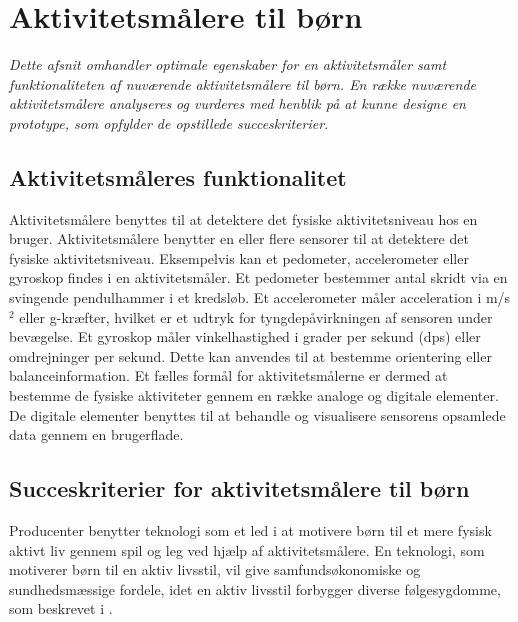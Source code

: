 \section{Aktivitetsmålere til børn} \label{tracker_intro}
\textit{Dette afsnit omhandler optimale egenskaber for en aktivitetsmåler samt funktionaliteten af nuværende aktivitetsmålere til børn. En række nuværende aktivitetsmålere analyseres og vurderes med henblik på at kunne designe en prototype, som opfylder de opstillede succeskriterier.}

\subsection{Aktivitetsmåleres funktionalitet}
Aktivitetsmålere benyttes til at detektere det fysiske aktivitetsniveau hos en bruger. Aktivitetsmålere benytter en eller flere sensorer til at detektere det fysiske aktivitetsniveau. Eksempelvis kan et pedometer, accelerometer eller gyroskop findes i en aktivitetsmåler. Et pedometer bestemmer antal skridt via en svingende pendulhammer i et kredsløb. Et accelerometer måler acceleration i m/s$^2$ eller g-kræfter, hvilket er et udtryk for tyngdepåvirkningen af sensoren under bevægelse. Et gyroskop måler vinkelhastighed i grader per sekund (dps) eller omdrejninger per sekund. Dette kan anvendes til at bestemme orientering eller balanceinformation. \citep{Sparkfun,Woodford2016,Sparkfun_gyro} \newline
Et fælles formål for aktivitetsmålerne er dermed at bestemme de fysiske aktiviteter gennem en række analoge og digitale elementer. De digitale elementer benyttes til at behandle og visualisere sensorens opsamlede data gennem en brugerflade.

\subsection{Succeskriterier for aktivitetsmålere til børn} \label{succeskrav}
Producenter benytter teknologi som et led i at motivere børn til et mere fysisk aktivt liv gennem spil og leg ved hjælp af aktivitetsmålere. \citep{Fuhu2015,PowerAbout2015} En teknologi, som motiverer børn til en aktiv livsstil, vil give samfundsøkonomiske og sundhedsmæssige fordele, idet en aktiv livsstil forbygger diverse følgesygdomme, som beskrevet i .


